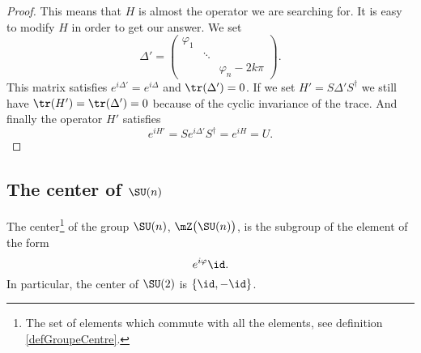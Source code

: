 \begin{proof}
    This means that \( H\) is almost the operator we are searching for. It is easy to modify \( H\) in order to get our answer. We set
    \begin{equation}
        \Delta'=\begin{pmatrix}
            \varphi_1    &       &       \\
                &   \ddots   &       \\
                &       &   \varphi_n-2k\pi
        \end{pmatrix}.
    \end{equation}
    This matrix satisfies \(   e^{i\Delta'}= e^{i\Delta}\) and \( \tr(\Delta')=0\). If we set \( H'=S\Delta'S^{\dag}\) we still have \( \tr(H')=\tr(\Delta')=0\) because of the cyclic invariance of the trace. And finally the operator \( H'\) satisfies
    \begin{equation}
        e^{iH'}=S e^{i\Delta'}S^{\dag}= e^{iH}=U.
    \end{equation}
\end{proof}

\subsection{The center of \texorpdfstring{$ \SU(n)$}{SUn} }

\begin{proposition}     \label{PROPooLMGHooKrKpsa}
    The center\footnote{The set of elements which commute with all the elements, see definition \ref{defGroupeCentre}.} of the group \( \SU(n)\), \( \mZ\big( \SU(n) \big)\), is the subgroup of the element of the form
    \begin{equation}
        e^{i\varphi}\id.
    \end{equation}
    In particular, the center of \( \SU(2)\) is \( \{ \id,-\id \}\).
\end{proposition}

